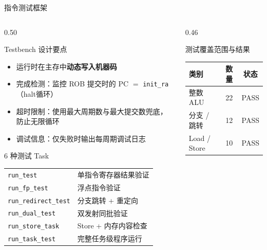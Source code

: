 \documentclass[aspectratio=169,xcolor={dvipsnames,svgnames},10pt]{beamer}
\newcommand{\hl}[1]{\textcolor{AccentOrange}{\textbf{#1}}}
\newcommand{\code}[1]{\texttt{\small\color{PrimaryBlue}#1}}
\begin{document}
\begin{frame}[shrink=8]{指令测试框架}
  \begin{columns}[T]
    \begin{column}{0.50\textwidth}
      \begin{block}{Testbench 设计要点}
        \small
        \begin{itemize}
          \item 运行时在主存中\hl{动态写入机器码}
          \item 完成检测：监控 ROB 提交时的 PC $=$ \code{init\_ra}（halt循环）
          \item 超时限制：使用最大周期数与最大提交数兜底，防止无限循环
          \item 调试信息：仅失败时输出每周期调试日志
        \end{itemize}
      \end{block}
      \vspace{0.15cm}
      \begin{block}{6 种测试 Task}
        \small
        \renewcommand{\arraystretch}{1.1}
        \begin{tabular}{ll}
          \code{run\_test}          & 单指令寄存器结果验证 \\
          \code{run\_fp\_test}      & 浮点指令验证 \\
          \code{run\_redirect\_test}& 分支跳转 + 重定向 \\
          \code{run\_dual\_test}    & 双发射同批验证 \\
          \code{run\_store\_task}   & Store + 内存内容检查 \\
          \code{run\_task\_test}    & 完整任务级程序运行 \\
        \end{tabular}
      \end{block}
    \end{column}
    \begin{column}{0.46\textwidth}
      \begin{block}{测试覆盖范围与结果}
        \small\renewcommand{\arraystretch}{1.2}
        \begin{tabular}{lcc}
          \toprule
          \textbf{类别} & \textbf{数量} & \textbf{状态} \\
          \midrule
          整数 ALU              & 22 & PASS \\
          分支 / 跳转           & 12 & PASS \\
          Load / Store          & 10 & PASS \\

\end{tabular}
\end{block}
\end{column}
\end{columns}
\end{frame}
\end{document}
